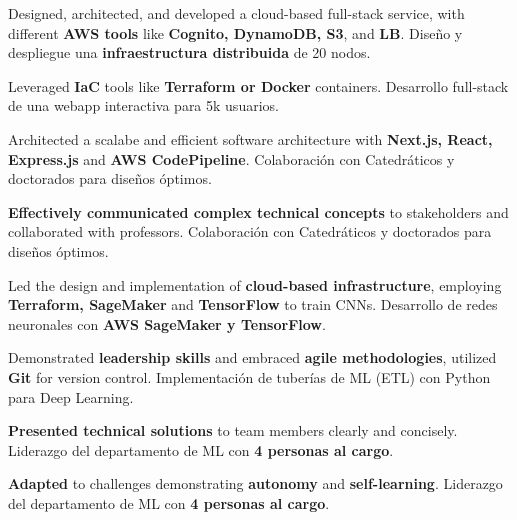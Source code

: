 \documentclass[]{cv}
\begin{document}
\begin{minipage}[t][0pt]{\linewidth}
\begin{minipage}[t]{0.57\textwidth}
\begin{tightemize}
\item \dumblang
  {Designed, architected, and developed a cloud-based full-stack service, with different \textbf{AWS tools} like \textbf{Cognito, DynamoDB, S3}, and \textbf{LB}.}
  {Diseño y despliegue una \textbf{infraestructura distribuida} de 20 nodos.}
\item \dumblang
  {Leveraged \textbf{IaC} tools like \textbf{Terraform or Docker} containers.}
  {Desarrollo full-stack de una webapp interactiva para 5k usuarios.}
\item \dumblang
  {Architected a scalabe and efficient software architecture with \textbf{Next.js, React, Express.js} and \textbf{AWS CodePipeline}.}
  {Colaboración con Catedráticos y doctorados para diseños óptimos.}
\item \dumblang
  {\textbf{Effectively communicated complex technical concepts} to stakeholders and collaborated with professors.}
  {Colaboración con Catedráticos y doctorados para diseños óptimos.}
\end{tightemize}

\begin{tightemize}
\item \dumblang
  {Led the design and implementation of \textbf{cloud-based infrastructure}, employing \textbf{Terraform, SageMaker} and \textbf{TensorFlow} to train CNNs.}
  {Desarrollo de redes neuronales con \textbf{AWS SageMaker y TensorFlow}.}
\item \dumblang
  {Demonstrated \textbf{leadership skills} and embraced \textbf{agile methodologies}, utilized \textbf{Git} for version control.}
  {Implementación de tuberías de ML (ETL) con Python para Deep Learning.}
\item \dumblang
  {\textbf{Presented technical solutions} to team members clearly and concisely.}
  {Liderazgo del departamento de ML con \textbf{4 personas al cargo}.}
\item \dumblang
  {\textbf{Adapted} to challenges demonstrating \textbf{autonomy} and \textbf{self-learning}.}
  {Liderazgo del departamento de ML con \textbf{4 personas al cargo}.}
\end{tightemize}


\end{minipage}
\end{minipage}
\end{document}
